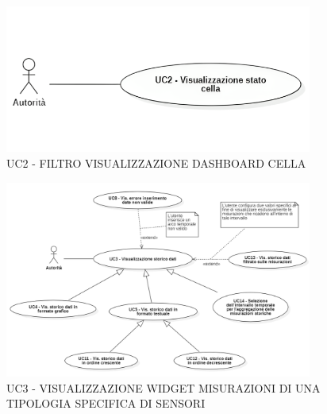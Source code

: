 

\begin{figure}[H]
    \centering
    \includegraphics[width=0.9\textwidth]{../Images/uc2.png}
    \caption{UC2 - FILTRO VISUALIZZAZIONE DASHBOARD CELLA}
    \label{fig:UC2}
\end{figure}


\begin{figure}[H]
    \centering
    \includegraphics[width=0.9\textwidth]{../Images/uc3.png}
    \caption{UC3 - VISUALIZZAZIONE WIDGET MISURAZIONI DI UNA TIPOLOGIA SPECIFICA DI SENSORI}
    \label{fig:UC3}
\end{figure}


